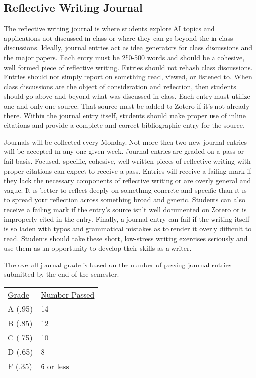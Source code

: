 \documentclass[]{tufte-handout}
\begin{document}
\subsection{Reflective Writing Journal}

The reflective writing journal is where students explore AI topics and applications not discussed in class or where they can go beyond the in class discussions. Ideally, journal entries act as idea generators for class discussions and the major papers. Each entry must be 250-500 words and should be a cohesive, well formed piece of reflective writing. Entries should not rehash class discussions. Entries should not simply report on something read, viewed, or listened to. When class discussions are the object of consideration and reflection, then students should go above and beyond what was discussed in class. Each entry must utilize one and only one source. That source must be added to Zotero if it's not already there. Within the journal entry itself, students should make proper use of inline citations and provide a complete and correct bibliographic entry for the source. 

Journals will be collected every Monday. Not more then two new journal entries will be accepted in any one given week. Journal entries are graded on a pass or fail basis. Focused, specific, cohesive, well written pieces of reflective writing with proper citations can expect to receive a pass. Entries will receive a failing mark if they lack the necessary components of reflective writing or are overly general and vague. It is better to reflect deeply on something concrete and specific than it is to spread your reflection across something broad and generic. Students can also receive a failing mark if the entry's source isn't well documented on Zotero or is improperly cited in the entry. Finally, a journal entry can fail if the writing itself is so laden with typos and grammatical mistakes as to render it overly difficult to read.  Students should take these short, low-stress writing exercises seriously and use them as an opportunity to develop their skills as a writer. 

The overall journal grade is based on the number of passing journal entries submitted by the end of the semester. 

\begin{center}
\begin{tabular}{ll}
\underline{Grade} & \underline{Number Passed} \\
A (.95) & 14 \\
B (.85) & 12 \\
C (.75) & 10 \\
D (.65) & 8\\
F (.35) & 6 or less \\
\end{tabular}
\end{center}
\end{document}
